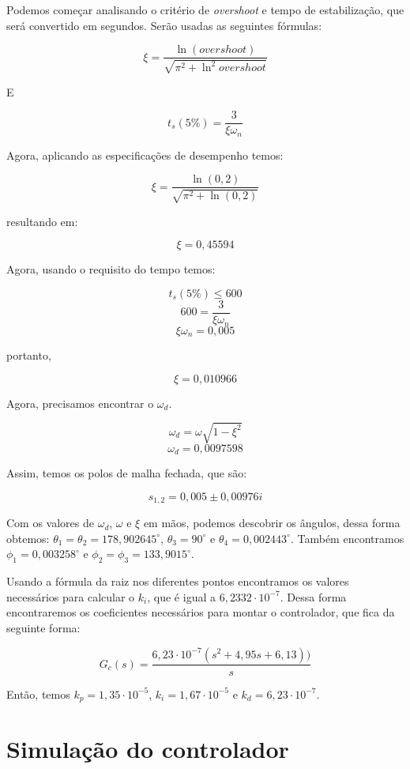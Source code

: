 \documentclass[
	12pt,				%
	openany,			%
	oneside,			%
	a4paper,			%
	english,			%
	french,				%
	spanish,			%
	brazil,				%
	]{abntex2}
\begin{document}
{Podemos começar analisando o critério de \textit{overshoot} e tempo de estabilização, que será convertido em segundos. Serão usadas as seguintes fórmulas:

\begin{equation}
	\xi = \frac{\ln(overshoot)}{\sqrt{\pi^2+\ln^2overshoot}}
\end{equation}

E

\begin{equation}
	t_s(5\%) = \frac{3}{\xi\omega_n}
\end{equation}

Agora, aplicando as especificações de desempenho temos:

$$\xi = \frac{\ln(0,2)}{\sqrt{\pi^2 + \ln(0,2)}}$$

resultando em:

$$\xi = 0,45594$$

Agora, usando o requisito do tempo temos:

$$t_s(5\%) \leq 600 $$
$$600 = \frac{3}{\xi\omega_n}$$
$${\xi\omega_n} = 0,005$$

portanto, 

$$\xi = 0,010966$$

Agora, precisamos encontrar o $\omega_d$.

$$\omega_d = \omega \sqrt{1-\xi^2}$$
$$\omega_d = 0,0097598$$

Assim, temos os polos de malha fechada, que são:

$$s_{1,2} = 0,005 \pm 0,00976i$$

Com os valores de $\omega_d$, $\omega$ e $\xi$ em mãos, podemos descobrir os ângulos, dessa forma obtemos: $\theta_1 = \theta_2 = 178,902645^{\circ}$, $\theta_3 = 90^{\circ}$ e $\theta_4 = 0,002443^{\circ}$. Também encontramos $\phi_1 = 0,003258^{\circ}$ e $\phi_2 = \phi_3 = 133,9015^{\circ}$.

Usando a fórmula da raiz nos diferentes pontos encontramos os valores necessários para calcular o $k_i$, que é igual a $6,2332 \cdot 10^{-7}$. Dessa forma encontraremos os coeficientes necessários para montar o controlador, que fica da seguinte forma:

$$G_c(s) = \frac{6,23 \cdot 10^{-7}(s^2+4,95s+6,13))}{s}$$

Então, temos $k_p = 1,35 \cdot 10^{-5}$, $k_i = 1,67\cdot 10^{-5}$ e $k_d = 6,23\cdot 10^{-7} $.

\section{Simulação do controlador}

}
\end{document}
